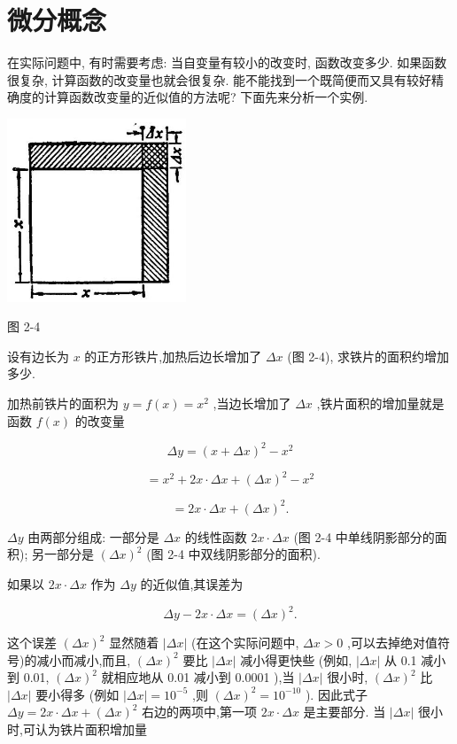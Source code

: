 \documentclass[lang=cn,newtx,10pt,scheme=chinese]{elegantbook}
\begin{document}
\section{微分概念}

在实际问题中, 有时需要考虑: 当自变量有较小的改变时, 函数改变多少. 如果函数很复杂, 计算函数的改变量也就会很复杂. 能不能找到一个既简便而又具有较好精确度的计算函数改变量的近似值的方法呢? 下面先来分析一个实例.

\begin{center}
\includegraphics[max width=0.4\textwidth]{images/01912c18-5c3f-733d-b775-749ba9897a9d_110_353714.jpg}
\end{center}

图 2-4

设有边长为 \(x\) 的正方形铁片,加热后边长增加了 \({\Delta x}\) (图 2-4), 求铁片的面积约增加多少.

加热前铁片的面积为 \(y = f\left( x\right) = {x}^{2}\) ,当边长增加了 \({\Delta x}\) ,铁片面积的增加量就是函数 \(f\left( x\right)\) 的改变量

\[
{\Delta y} = {\left( x + \Delta x\right) }^{2} - {x}^{2}
\]

\[
= {x}^{2} + {2x} \cdot {\Delta x} + {\left( \Delta x\right) }^{2} - {x}^{2}
\]

\[
= {2x} \cdot {\Delta x} + {\left( \Delta x\right) }^{2}\text{.} \tag{1}
\]

\({\Delta y}\) 由两部分组成: 一部分是 \({\Delta x}\) 的线性函数 \({2x} \cdot {\Delta x}\) (图 2-4 中单线阴影部分的面积); 另一部分是 \({\left( \Delta x\right) }^{2}\) (图 2-4 中双线阴影部分的面积).

如果以 \({2x} \cdot {\Delta x}\) 作为 \({\Delta y}\) 的近似值,其误差为

\[
{\Delta y} - {2x} \cdot {\Delta x} = {\left( \Delta x\right) }^{2}.
\]

这个误差 \({\left( \Delta x\right) }^{2}\) 显然随着 \(\left| {\Delta x}\right|\) (在这个实际问题中, \({\Delta x} > 0\) ,可以去掉绝对值符号)的减小而减小,而且, \({\left( \Delta x\right) }^{2}\) 要比 \(\left| {\Delta x}\right|\) 减小得更快些 (例如, \(\left| {\Delta x}\right|\) 从 0.1 减小到 0.01, \({\left( \Delta x\right) }^{2}\) 就相应地从 0.01 减小到 0.0001 ),当 \(\left| {\Delta x}\right|\) 很小时, \({\left( \Delta x\right) }^{2}\) 比 \(\left| {\Delta x}\right|\) 要小得多 (例如 \(\left| {\Delta x}\right| = {10}^{-5}\) ,则 \({\left( \Delta x\right) }^{2} = {10}^{-{10}}\) ). 因此式子 \({\Delta y} = {2x} \cdot {\Delta x} + {\left( \Delta x\right) }^{2}\) 右边的两项中,第一项 \({2x} \cdot {\Delta x}\) 是主要部分. 当 \(\left| {\Delta x}\right|\) 很小时,可认为铁片面积增加量
\end{document}
